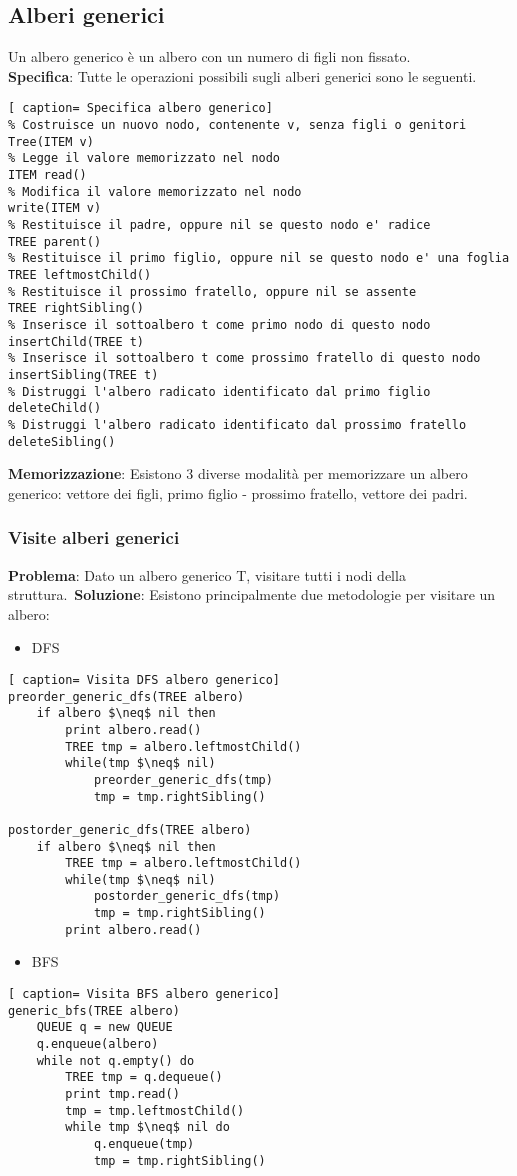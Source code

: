 \documentclass[../cheatSheetAlgoritmi.tex]{subfiles}
\begin{document}
\subsection{Alberi generici}
Un albero generico è un albero con un numero di figli non fissato.\\
\textbf{Specifica}: Tutte le operazioni possibili sugli alberi generici sono le seguenti. 
\begin{lstlisting}[ caption= Specifica albero generico]
% Costruisce un nuovo nodo, contenente v, senza figli o genitori
Tree(ITEM v)
% Legge il valore memorizzato nel nodo
ITEM read()
% Modifica il valore memorizzato nel nodo
write(ITEM v)
% Restituisce il padre, oppure nil se questo nodo e' radice
TREE parent()
% Restituisce il primo figlio, oppure nil se questo nodo e' una foglia
TREE leftmostChild()
% Restituisce il prossimo fratello, oppure nil se assente
TREE rightSibling()
% Inserisce il sottoalbero t come primo nodo di questo nodo
insertChild(TREE t)
% Inserisce il sottoalbero t come prossimo fratello di questo nodo
insertSibling(TREE t)
% Distruggi l'albero radicato identificato dal primo figlio
deleteChild()
% Distruggi l'albero radicato identificato dal prossimo fratello
deleteSibling()
\end{lstlisting}
\textbf{Memorizzazione}: Esistono 3 diverse modalità per memorizzare un albero generico: vettore dei figli, primo figlio - prossimo fratello, vettore dei padri.\
\newpage

\subsubsection{Visite alberi generici}
\textbf{Problema}: Dato un albero generico T, visitare tutti i nodi della struttura.\
\textbf{Soluzione}: Esistono principalmente due metodologie per visitare un albero:
\begin{itemize}
	\item DFS
\end{itemize}
\begin{lstlisting}[ caption= Visita DFS albero generico]
preorder_generic_dfs(TREE albero)
	if albero $\neq$ nil then
		print albero.read()
		TREE tmp = albero.leftmostChild()
		while(tmp $\neq$ nil)
			preorder_generic_dfs(tmp)
			tmp = tmp.rightSibling()
    
postorder_generic_dfs(TREE albero)
	if albero $\neq$ nil then
		TREE tmp = albero.leftmostChild()
		while(tmp $\neq$ nil)
			postorder_generic_dfs(tmp)
			tmp = tmp.rightSibling()
		print albero.read()
\end{lstlisting}
\begin{itemize}
 	\item BFS
\end{itemize}
\begin{lstlisting}[ caption= Visita BFS albero generico]
generic_bfs(TREE albero)
	QUEUE q = new QUEUE
	q.enqueue(albero)
	while not q.empty() do
		TREE tmp = q.dequeue()
		print tmp.read()
		tmp = tmp.leftmostChild()
		while tmp $\neq$ nil do
			q.enqueue(tmp)
			tmp = tmp.rightSibling()
\end{lstlisting}
\newpage
\end{document}
